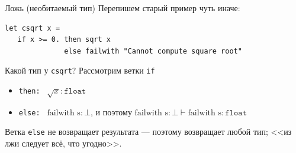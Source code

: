 \documentclass[aspectratio=169]{beamer}
\begin{document}
\begin{frame}[fragile]{Ложь (необитаемый тип)}
Перепишем старый пример чуть иначе:
\begin{verbatim}
let csqrt x =
   if x >= 0. then sqrt x
              else failwith "Cannot compute square root"
\end{verbatim}

Какой тип у \verb!csqrt!? Рассмотрим ветки \verb!if!
\begin{itemize}
\item \verb!then: ! $\sqrt x : \texttt{float}$
\item \verb!else: ! $\text{failwith s} : \bot$, и поэтому $\text{failwith s} : \bot \vdash \text{failwith s} : \texttt{float}$
\end{itemize}
Ветка \verb!else! не возвращает результата --- поэтому возвращает любой тип; <<из лжи следует всё, что угодно>>.
\end{frame}

%
%
\end{document}
